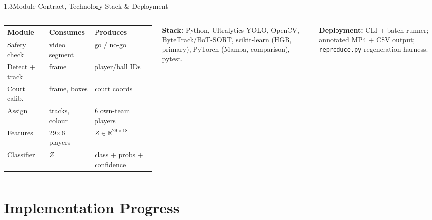 \documentclass[aspectratio=169, 11pt]{beamer}
\begin{document}
\begin{frame}[t]{1.3\quad Module Contract, Technology Stack \& Deployment}
    \scriptsize
    \begin{columns}[t]
        \begin{tabular}{@{}p{2.3cm}p{2.1cm}p{2.5cm}@{}}
            \toprule
            \textbf{Module} & \textbf{Consumes} & \textbf{Produces} \\
            \midrule
            Safety check     & video segment  & go / no-go \\
            Detect + track   & frame          & player/ball IDs \\
            Court calib.     & frame, boxes   & court coords \\
            Assign           & tracks, colour & 6 own-team players \\
            Features         & 29$\times$6 players & $Z \in \mathbb{R}^{29\times18}$ \\
            Classifier       & $Z$            & class + probs + confidence \\
            \bottomrule
        \end{tabular}
        \textbf{Stack:} Python, Ultralytics YOLO, OpenCV, ByteTrack/BoT-SORT,
        scikit-learn (HGB, primary), PyTorch (Mamba, comparison), pytest.

        \vspace{0.15cm}
        \textbf{Deployment:} CLI + batch runner; annotated MP4 + CSV output;
        \texttt{reproduce.py} regeneration harness.
    \end{columns}
\end{frame}

\section{Implementation Progress}
\end{document}

